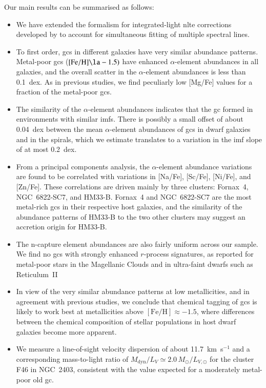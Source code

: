 \documentclass{aa}
\begin{document}
Our main results can be summarised as follows:

\begin{itemize}
    \item We have extended the formalism for integrated-light \ac{nlte} corrections developed by \citet{Eitner2019} to account for simultaneous fitting of multiple spectral lines.  
    \item To first order, \acp{gc} in different galaxies have very similar abundance patterns. Metal-poor \acp{gc} ($\mathrm{[Fe/H]}\la-1.5)$ have enhanced $\alpha$-element abundances in all galaxies, and the overall scatter in the $\alpha$-element abundances is less than 0.1~dex. As in previous studies, we find peculiarly low [Mg/Fe] values for a fraction of the metal-poor \acp{gc}.
    \item The similarity of the $\alpha$-element abundances indicates that the \ac{gc} formed in environments with similar \acp{imf}. There is possibly a small offset of about 0.04~dex between the mean $\alpha$-element abundances of \acp{gc} in dwarf galaxies and in the spirals, which we estimate translates to a variation in the \ac{imf} slope of at most 0.2~dex.
   \item From a principal components analysis, the $\alpha$-element abundance variations are found to be correlated with variations in [Na/Fe], [Sc/Fe], [Ni/Fe], and [Zn/Fe]. These correlations are driven mainly by three clusters: Fornax~4, NGC~6822-SC7, and HM33-B. Fornax~4 and NGC~6822-SC7 are the most metal-rich \acp{gc} in their respective host galaxies, and the similarity of the abundance patterns of HM33-B to the two other clusters may suggest an accretion origin for HM33-B. 
   \item The n-capture element abundances are also fairly uniform across our sample. We find no \acp{gc} with strongly enhanced $r$-process signatures, as reported for metal-poor stars in the Magellanic Clouds \citep{Reggiani2021} and in ultra-faint dwarfs such as Reticulum~II \citep{Ji2016,Roederer2016}
  \item In view of the very similar abundance patterns at low metallicities, and in agreement with previous studies, we conclude that chemical tagging of \acp{gc} is likely to work best at metallicities above $\mathrm{[Fe/H]}\approx-1.5$, where differences between the chemical composition of stellar populations in host dwarf galaxies become more apparent. 
  \item We measure a line-of-sight velocity dispersion of about 11.7~km~s$^{-1}$ and a corresponding mass-to-light ratio of $M_\mathrm{dyn}/L_V \simeq 2.0 \, M_\odot/L_{V,\odot}$ for the cluster F46 in NGC~2403, consistent with the value expected for a moderately metal-poor old \ac{gc}.
\end{itemize}
\end{document}
